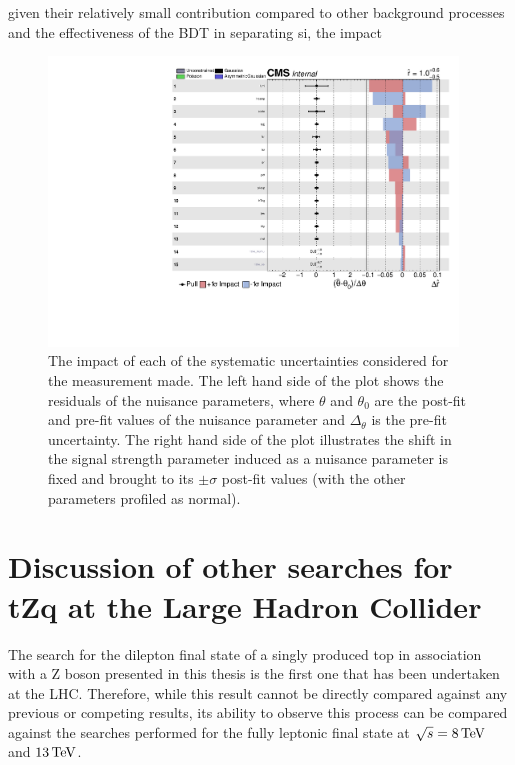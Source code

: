 given their relatively small contribution compared to other background processes and the effectiveness of the BDT in separating si, the impact 

\begin{figure}[htbp]
\begin{center}
\includegraphics[width=0.97\textwidth]{figs/results/systematicsImpact.pdf}
\caption{The impact of each of the systematic uncertainties considered for the measurement made. The left hand side of the plot shows the residuals of the nuisance parameters, where $\theta$ and $\theta_{0}$ are the post-fit and pre-fit values of the nuisance parameter and $\Delta_{\theta}$ is the pre-fit uncertainty. The right hand side of the plot illustrates the shift in the signal strength parameter induced as a nuisance parameter is fixed and brought to its $\pm \sigma$ post-fit values (with the other parameters profiled as normal).}
\label{fig:systematicsPull}
\end{center}
\end{figure}

\section{Discussion of other searches for tZq at the Large Hadron Collider}
The search for the dilepton final state of a singly produced top in association with a Z boson presented in this thesis is the first one that has been undertaken at the LHC.
Therefore, while this result cannot be directly compared against any previous or competing results, its ability to observe this process can be compared against the searches performed for the fully leptonic	final state at $\sqrt{s} = 8 \,\text{Te\hspace{-.08em}V}$ and $13 \,\text{Te\hspace{-.08em}V}$.

